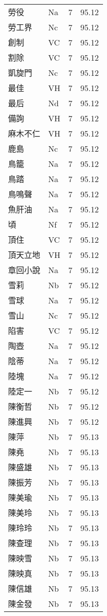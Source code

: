 \documentclass[twocolumn]{book}
\begin{document}
\begin{supertabular}{llrr}
勞役 & Na & 7 &  95.12\\
勞工界 & Nc & 7 &  95.12\\
創制 & VC & 7 &  95.12\\
割除 & VC & 7 &  95.12\\
凱旋門 & Nc & 7 &  95.12\\
最佳 & VH & 7 &  95.12\\
最后 & Nd & 7 &  95.12\\
備詢 & VH & 7 &  95.12\\
麻木不仁 & VH & 7 &  95.12\\
鹿島 & Nc & 7 &  95.12\\
鳥籠 & Na & 7 &  95.12\\
鳥踏 & Na & 7 &  95.12\\
鳥鳴聲 & Na & 7 &  95.12\\
魚肝油 & Na & 7 &  95.12\\
頃 & Nf & 7 &  95.12\\
頂住 & VC & 7 &  95.12\\
頂天立地 & VH & 7 &  95.12\\
章回小說 & Na & 7 &  95.12\\
雪莉 & Nb & 7 &  95.12\\
雪球 & Na & 7 &  95.12\\
雪山 & Nc & 7 &  95.12\\
陷害 & VC & 7 &  95.12\\
陶壺 & Na & 7 &  95.12\\
陰蒂 & Na & 7 &  95.12\\
陸塊 & Na & 7 &  95.12\\
陸定一 & Nb & 7 &  95.12\\
陳衡哲 & Nb & 7 &  95.12\\
陳進興 & Nb & 7 &  95.12\\
陳萍 & Nb & 7 &  95.13\\
陳堯 & Nb & 7 &  95.13\\
陳盛雄 & Nb & 7 &  95.13\\
陳振芳 & Nb & 7 &  95.13\\
陳美瑜 & Nb & 7 &  95.13\\
陳美玲 & Nb & 7 &  95.13\\
陳玲玲 & Nb & 7 &  95.13\\
陳查理 & Nb & 7 &  95.13\\
陳映雪 & Nb & 7 &  95.13\\
陳映真 & Nb & 7 &  95.13\\
陳信雄 & Nb & 7 &  95.13\\
陳金發 & Nb & 7 &  95.13\\

\end{supertabular}
\end{document}
